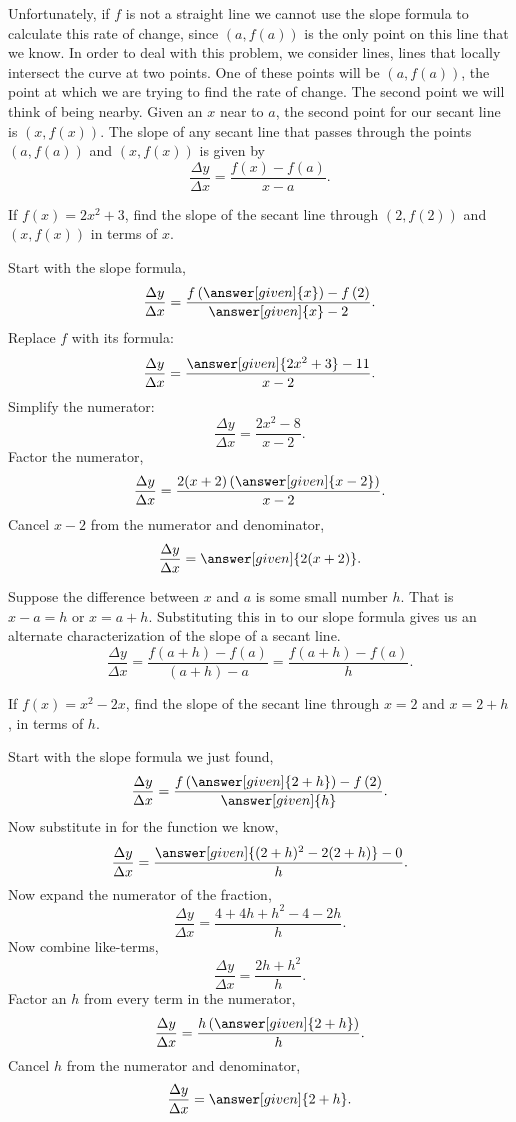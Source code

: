 \documentclass{ximera}
\begin{document}
Unfortunately, if $f$ is not a straight line we cannot use the slope
formula to calculate this rate of change, since $(a,f(a))$ is the only
point on this line that we know.  In order to deal with this problem,
we consider  lines, lines that locally intersect the curve
at two points.  One of these points will be $(a, f(a))$, the point at
which we are trying to find the rate of change.  The second point we will
think of being nearby.  Given an $x$ near to $a$, the
second point for our secant line is $(x, f(x))$.  The slope of any
secant line that passes through the points $(a,f(a))$ and $(x,
f(x))$ is given by
\[
\frac{\Delta y}{\Delta x}=\frac{f(x) - f(a)}{x - a}.
\]

\begin{example}
	If $f(x) = 2x^2+3$, find the slope of the secant line through $(2,f(2))$
	and $(x,f(x))$ in terms of $x$.
	
	\begin{explanation}
		Start with the slope formula,
		\[
		\frac{\Delta y}{\Delta x} =
                \frac{f\left(\answer[given]{x}\right)-f\left(2\right)}
                     {\answer[given]{x} - 2}.
		\]
		Replace $f$ with its formula:
		\[
		\frac{\Delta y}{\Delta x} = \frac{\answer[given]{2x^2+3} - 11}{x-2}.
		\]
		Simplify the numerator:
		\[
		\frac{\Delta y}{\Delta x} = \frac{2x^2-8}{x-2}.
		\]
		Factor the numerator,
		\[
		\frac{\Delta y}{\Delta x} = \frac{2(x+2)\left(\answer[given]{x-2}\right)}{x-2}.
		\]
		Cancel $x-2$ from the numerator and denominator,
		\[
		\frac{\Delta y}{\Delta x} = \answer[given]{2(x+2)}.
		\]
	\end{explanation}
\end{example}

Suppose the difference between $x$ and $a$ is some small number $h$.  That
is $x-a=h$ or $x=a+h$.  Substituting this in to our slope formula gives us
an alternate characterization of the slope of a secant line.
\[
\frac{\Delta y}{\Delta x} = \frac{f(a+h)-f(a)}{(a+h)-a} = \frac{f(a+h)-f(a)}{h}.
\]

\begin{example}
  If $f(x) = x^2-2x$, find the slope of the secant line through $x=2$ and $x=2+h$, in terms of $h$.
  \begin{explanation}
    Start with the slope formula we just found,
    \[
    \frac{\Delta y}{\Delta x} = \frac{f\left(\answer[given]{2+h}\right)-f\left(2\right)}{\answer[given]{h}}.
    \]
    Now substitute in for the function we know,
    \[
    \frac{\Delta y}{\Delta x} = \frac{\answer[given]{(2+h)^2-2(2+h)} -0}{h}.
    \]
    Now expand the numerator of the fraction,
    \[
    \frac{\Delta y}{\Delta x} = \frac{4+4h+h^2-4-2h }{h}.
    \]
    Now combine like-terms,
    \[
    \frac{\Delta y}{\Delta x} = \frac{2h+h^2}{h}.
    \]
    Factor an $h$ from every term in the numerator,
    \[
    \frac{\Delta y}{\Delta x} = \frac{h\left(\answer[given]{2+h}\right)}{h}.
    \]
    Cancel $h$ from the numerator and denominator,
    \[
    \frac{\Delta y}{\Delta x} = \answer[given]{2+h}. 
    \]
  \end{explanation}
\end{example}
\end{document}
